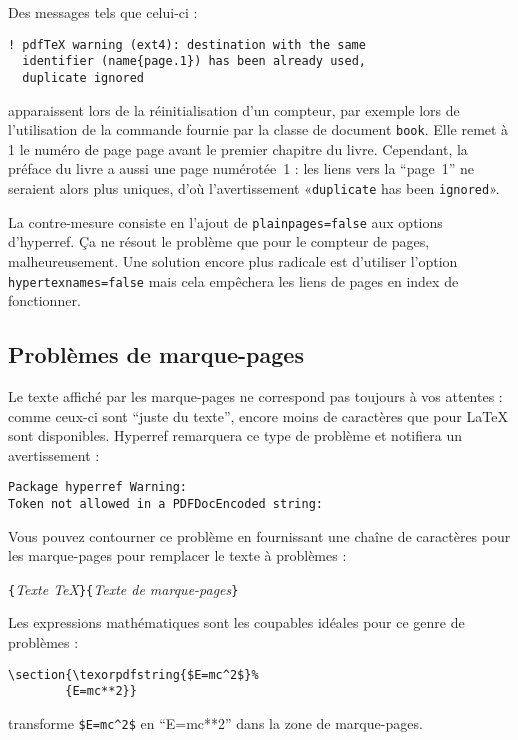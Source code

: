 Des messages tels que celui-ci :
\begin{verbatim}
! pdfTeX warning (ext4): destination with the same
  identifier (name{page.1}) has been already used,
  duplicate ignored
\end{verbatim}
apparaissent lors de la réinitialisation d'un compteur, par exemple
lors de l'utilisation de la commande  fournie par la
classe de document \texttt{book}. Elle remet à 1 le numéro de page
page avant le premier chapitre du livre. Cependant, la préface du
livre a aussi une page numérotée~1 : les liens vers la
\enquote{page~1} ne seraient alors plus uniques, d'où l'avertissement
«\verb|duplicate| has been \verb|ignored|».

La contre-mesure consiste en l'ajout de \texttt{plainpages=false} aux
options d'hyperref. Ça ne résout le problème que pour le compteur de
pages, malheureusement.
Une solution encore plus radicale est d'utiliser l'option\\
\texttt{hypertexnames=false} mais cela empêchera les liens de pages en
index de fonctionner.

\subsection{Problèmes de marque-pages}

Le texte affiché par les marque-pages ne correspond pas toujours à vos
attentes : comme ceux-ci sont \enquote{juste du texte}, encore moins de
caractères que pour \LaTeX{} sont disponibles. Hyperref remarquera ce
type de problème et notifiera un avertissement :
\begin{code}
\begin{verbatim}
Package hyperref Warning:
Token not allowed in a PDFDocEncoded string:
\end{verbatim}
\end{code}
Vous pouvez contourner ce problème en fournissant une chaîne de
caractères pour les marque-pages pour remplacer le texte à problèmes :
\begin{lscommand}
\verb|{|\emph{Texte \TeX{}}\verb|}{|\emph{Texte de marque-pages}\verb|}|
\end{lscommand}


Les expressions mathématiques sont les coupables idéales pour ce genre
de problèmes :
\begin{code}
\begin{verbatim}
\section{\texorpdfstring{$E=mc^2$}%
        {E=mc**2}}
\end{verbatim}
\end{code}
transforme \verb+$E=mc^2$+ en \enquote{E=mc**2} dans la zone de
marque-pages.

